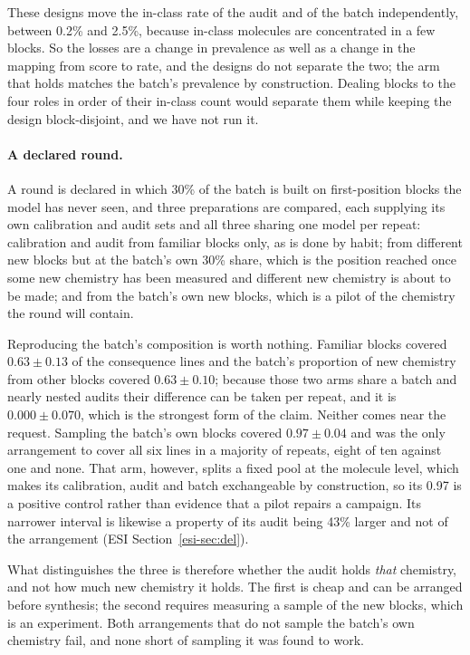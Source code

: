 \documentclass[twocolumn,10pt]{article}
\begin{document}
These designs move the in-class rate of the audit and of the batch independently, between 0.2\%
and 2.5\%, because in-class molecules are concentrated in a few blocks. So the losses are a
change in prevalence as well as a change in the mapping from score to rate, and the designs do
not separate the two; the arm that holds matches the batch's prevalence by construction. Dealing
blocks to the four roles in order of their in-class count would separate them while keeping the
design block-disjoint, and we have not run it.

\paragraph{A declared round.} A round is declared in which 30\% of the batch is built on
first-position blocks the model has never seen, and three preparations are compared, each
supplying its own calibration and audit sets and all three sharing one model per repeat:
calibration and audit from familiar blocks only, as is done by habit; from different new
blocks but at the batch's own 30\% share, which is the position reached once some new chemistry has been measured and different new chemistry is about to be made; and from the batch's own new blocks,
which is a pilot of the chemistry the round will contain.

Reproducing the batch's composition is worth nothing. Familiar blocks covered $0.63\pm0.13$ of
the consequence lines and the batch's proportion of new chemistry from other blocks covered
$0.63\pm0.10$; because those two arms share a batch and nearly nested audits their difference can
be taken per repeat, and it is $0.000\pm0.070$, which is the strongest form of the claim. Neither
comes near the request. Sampling the batch's own blocks covered $0.97\pm0.04$ and was the only
arrangement to cover all six lines in a majority of repeats, eight of ten against one and none. That arm, however, splits a fixed pool at the molecule level, which makes its calibration, audit
and batch exchangeable by construction, so its 0.97 is a positive control rather than evidence
that a pilot repairs a campaign. Its narrower interval is likewise a property of its audit being
43\% larger and not of the arrangement (ESI Section~\ref{esi-sec:del}).

What distinguishes the three is therefore whether the audit holds \emph{that} chemistry, and not how much new chemistry it holds. The first is cheap and can be arranged before synthesis; the
second requires measuring a sample of the new blocks, which is an experiment. Both arrangements
that do not sample the batch's own chemistry fail, and none short of sampling it was found to
work.
\end{document}
